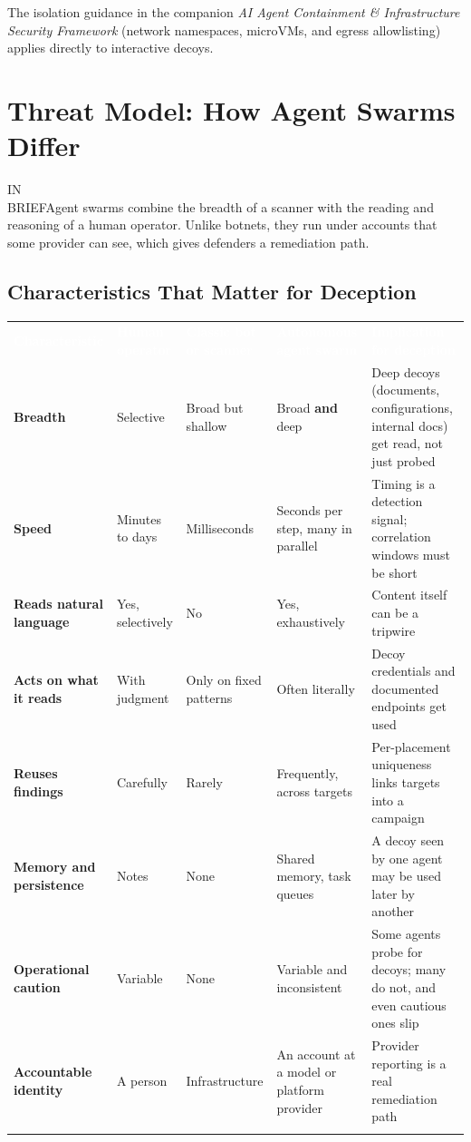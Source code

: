 \documentclass[11pt,letterpaper]{article}
\newcommand{\inbrief}[1]{\begin{inbriefbox}IN\\BRIEF\tcblower #1\end{inbriefbox}}
\newcommand{\hd}[1]{\textcolor{white}{\bfseries #1}}
\newcommand{\tablefinish}{\arrayrulecolor{deepindigo}\specialrule{0.8pt}{0pt}{0pt}\arrayrulecolor{black}}
\newcommand{\zebra}{\rowcolors{2}{white}{paleindigo!75}}
\begin{document}
The isolation guidance in the companion \emph{AI Agent Containment \& Infrastructure Security Framework} (network namespaces, microVMs, and egress allowlisting) applies directly to interactive decoys.

\section{Threat Model: How Agent Swarms Differ}
\label{sec:threat}

\inbrief{Agent swarms combine the breadth of a scanner with the reading and reasoning of a human operator. Unlike botnets, they run under accounts that some provider can see, which gives defenders a remediation path.}

\subsection{Characteristics That Matter for Deception}
\label{sec:characteristics}

{\footnotesize
\zebra
\begin{tabularx}{\textwidth}{L{2.2cm} L{1.9cm} L{2.0cm} L{2.9cm} Y}
\hd{Characteristic} & \hd{Human operator} & \hd{Classic bot or scanner} & \hd{Autonomous agent swarm} & \hd{Implication for deception} \\
\textbf{Breadth} & Selective & Broad but shallow & Broad \textbf{and} deep & Deep decoys (documents, configurations, internal docs) get read, not just probed \\
\textbf{Speed} & Minutes to days & Milliseconds & Seconds per step, many in parallel & Timing is a detection signal; correlation windows must be short \\
\textbf{Reads natural language} & Yes, selectively & No & Yes, exhaustively & Content itself can be a tripwire \\
\textbf{Acts on what it reads} & With judgment & Only on fixed patterns & Often literally & Decoy credentials and documented endpoints get used \\
\textbf{Reuses findings} & Carefully & Rarely & Frequently, across targets & Per-placement uniqueness links targets into a campaign \\
\textbf{Memory and persistence} & Notes & None & Shared memory, task queues & A decoy seen by one agent may be used later by another \\
\textbf{Operational caution} & Variable & None & Variable and inconsistent & Some agents probe for decoys; many do not, and even cautious ones slip \\
\textbf{Accountable identity} & A person & Infrastructure & An account at a model or platform provider & Provider reporting is a real remediation path \\
\tablefinish
\end{tabularx}\par}
\end{document}
